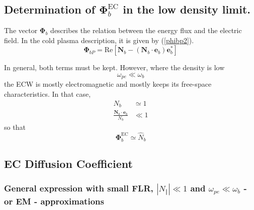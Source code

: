 \subsection{Determination of $\mathbf{\Phi}_{b}^{\text{EC}}$ in the low
density limit.}

The vector $\mathbf{\Phi}_{b}$ describes the relation between the energy flux
and the electric field. In the cold plasma description, it is given by
(\ref{phibp2}).
\begin{equation}
\mathbf{\Phi}_{bP}=\text{Re}\left[  \mathbf{N}_{b}-\left(  \mathbf{N}_{b}%
\cdot\mathbf{e}_{b}\right)  \mathbf{e}_{b}^{\ast}\right]
\end{equation}

In general, both terms must be kept. However, where the density is low
\begin{equation}
\omega_{pe}\ll\omega_{b}%
\end{equation}
the ECW is mostly electromagnetic and mostly keeps its free-space
characteristics. In that case,%
\begin{align}
N_{b}  &  \simeq1\label{nb}\\
\frac{\mathbf{N}_{b}\cdot\mathbf{e}_{b}}{N_{b}}  &  \ll1
\end{align}
so that
\begin{equation}
\mathbf{\Phi}_{b}^{\text{EC}}\simeq\widehat{N}_{b} \label{phibec}%
\end{equation}

\subsection{EC Diffusion Coefficient}

\subsubsection{General expression with small FLR, $\left|  N_{\Vert}\right|
\ll1$ and $\omega_{pe}\ll\omega_{b}$ - or EM - approximations}


